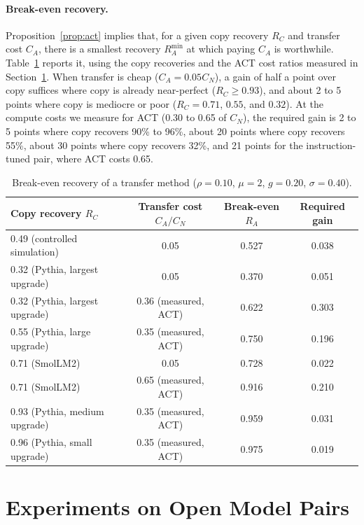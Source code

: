 \documentclass[acmsmall,review]{acmart}
\begin{document}
\paragraph{Break-even recovery.} Proposition~\ref{prop:act} implies that, for a given copy recovery $R_C$ and transfer cost
$C_A$, there is a smallest recovery $R_A^{\min}$ at which paying $C_A$ is worthwhile. Table~\ref{tab:breakeven} reports it, using the copy recoveries and
the ACT cost ratios measured in Section~\ref{sec:pairs}. When transfer is cheap ($C_A=0.05C_N$), a gain of half a point over copy suffices where copy is already
near-perfect ($R_C\ge 0.93$), and about 2 to 5 points where copy is mediocre or poor ($R_C=0.71$, $0.55$, and $0.32$). At the compute costs we measure for ACT (0.30 to 0.65 of $C_N$),
the required gain is 2 to 5 points where copy recovers 90\% to 96\%, about 20 points where copy recovers 55\%, about 30 points where copy recovers 32\%, and 21 points for the instruction-tuned pair, where ACT costs 0.65.

\begin{table}[t]
\centering
\caption{Break-even recovery of a transfer method ($\rho=0.10$, $\mu=2$, $g=0.20$, $\sigma=0.40$).}\label{tab:breakeven}
\begin{tabular}{lccc}
\toprule
Copy recovery $R_C$ & Transfer cost $C_A/C_N$ & Break-even $R_A$ & Required gain\\
\midrule
0.49 (controlled simulation) & 0.05 & 0.527 & 0.038\\
0.32 (Pythia, largest upgrade) & 0.05 & 0.370 & 0.051\\
0.32 (Pythia, largest upgrade) & 0.36 (measured, ACT) & 0.622 & 0.303\\
0.55 (Pythia, large upgrade) & 0.35 (measured, ACT) & 0.750 & 0.196\\
0.71 (SmolLM2) & 0.05 & 0.728 & 0.022\\
0.71 (SmolLM2) & 0.65 (measured, ACT) & 0.916 & 0.210\\
0.93 (Pythia, medium upgrade) & 0.35 (measured, ACT) & 0.959 & 0.031\\
0.96 (Pythia, small upgrade) & 0.35 (measured, ACT) & 0.975 & 0.019\\
\bottomrule
\end{tabular}
\end{table}

\section{Experiments on Open Model Pairs}\label{sec:pairs}
\end{document}
